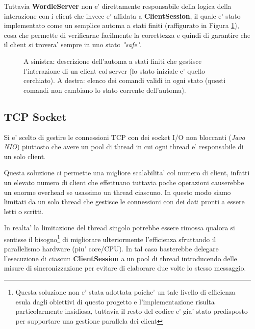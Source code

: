 Tuttavia \textbf{WordleServer} non e' direttamente responsabile della logica della interazione con i client che invece e' affidata a \textbf{ClientSession}, il quale e' stato implementato come un semplice automa a stati finiti (raffigurato in Figura \ref{fig:clientsession_asf}), cosa che permette di verificarne facilmente la correttezza e quindi di garantire che il client si trovera' sempre in uno stato \emph{"safe"}.

\begin{center}
	\begin{figure}[t!]
		\caption{A sinistra: descrizione dell'automa a stati finiti che gestisce l'interazione di un client col server (lo stato iniziale e' quello cerchiato). A destra: elenco dei comandi validi in ogni stato (questi comandi non cambiano lo stato corrente dell'automa).}
		\label{fig:clientsession_asf}
	\end{figure}
\end{center}

\subsection{TCP Socket}

Si e' scelto di gestire le connessioni TCP con dei socket I/O non bloccanti (\emph{Java NIO}) piuttosto che avere un pool di thread in cui ogni thread e' responsabile di un solo client.

Questa soluzione ci permette una migliore scalabilita' col numero di client, infatti un elevato numero di client che effettuano tuttavia poche operazioni causerebbe un enorme overhead se usassimo un thread ciascuno. In questo modo siamo limitati da un solo thread che gestisce le connessioni con dei dati pronti a essere letti o scritti.

In realta' la limitazione del thread singolo potrebbe essere rimossa qualora si sentisse il bisogno\footnote{Questa soluzione non e' stata adottata poiche' un tale livello di efficienza esula dagli obiettivi di questo progetto e l'implementazione risulta particolarmente insidiosa, tuttavia il resto del codice e' gia' stato predisposto per supportare una gestione parallela dei client} di migliorare ulteriormente l'efficienza sfruttando il parallelismo hardware (piu' core/CPU). In tal caso basterebbe delegare l'esecuzione di ciascun \textbf{ClientSession} a un pool di thread introducendo delle misure di sincronizzazione per evitare di elaborare due volte lo stesso messaggio.

